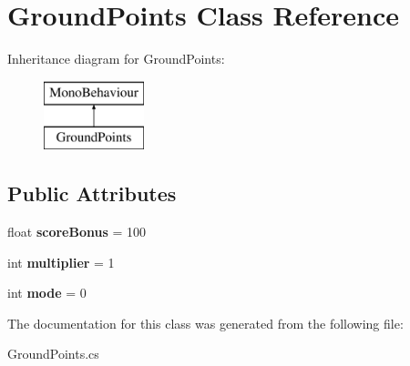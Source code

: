 \hypertarget{class_ground_points}{}\section{Ground\+Points Class Reference}
\label{class_ground_points}
Inheritance diagram for Ground\+Points\+:\begin{figure}[H]
\begin{center}
\leavevmode
\includegraphics[height=2.000000cm]{class_ground_points}
\end{center}
\end{figure}
\subsection*{Public Attributes}
\begin{DoxyCompactItemize}
\item 
\mbox{\label{class_ground_points_aec58fbff5b991b3b14c7a81864e7900b}} 
float {\bfseries score\+Bonus} = 100
\item 
\mbox{\label{class_ground_points_ab071f2fc5ced4f16d8ae34d5db534431}} 
int {\bfseries multiplier} = 1
\item 
\mbox{\label{class_ground_points_aae27448239119ba888f51242df8ee807}} 
int {\bfseries mode} = 0
\end{DoxyCompactItemize}


The documentation for this class was generated from the following file\+:\begin{DoxyCompactItemize}
\item 
Ground\+Points.\+cs\end{DoxyCompactItemize}
